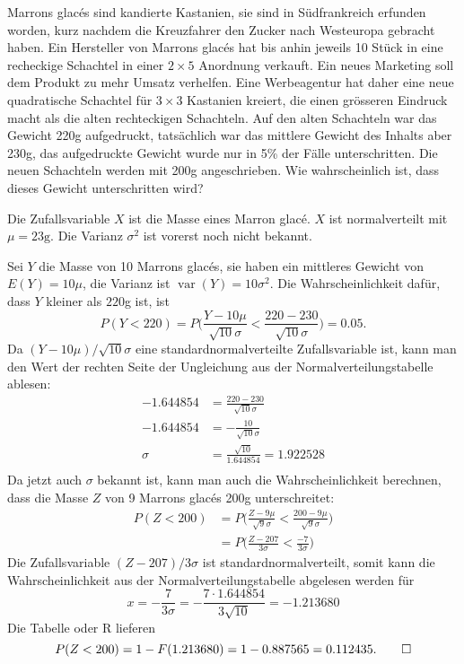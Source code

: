Marrons glac\'es sind kandierte Kastanien, sie sind in Südfrankreich
erfunden worden, kurz nachdem die Kreuzfahrer den Zucker nach Westeuropa
gebracht haben. Ein Hersteller von Marrons glac\'es hat bis anhin
jeweils 10 Stück in eine recheckige Schachtel in einer $2\times 5$
Anordnung verkauft. Ein neues Marketing soll dem Produkt zu mehr
Umsatz verhelfen. Eine Werbeagentur hat daher eine neue quadratische Schachtel 
für $3\times 3$ Kastanien kreiert, die einen grösseren Eindruck
macht als die alten rechteckigen Schachteln. Auf den alten Schachteln
war das Gewicht 220g aufgedruckt, tatsächlich war das mittlere
Gewicht des Inhalts aber 230g, das aufgedruckte Gewicht wurde
nur in 5\% der Fälle unterschritten. Die neuen Schachteln werden mit
200g angeschrieben. Wie wahrscheinlich ist, dass dieses Gewicht unterschritten
wird?


\begin{loesung}
Die Zufallsvariable $X$ ist die Masse eines Marron glac\'e. $X$ ist
normalverteilt mit $\mu = 23\text{g}$. Die Varianz $\sigma^2$ ist vorerst
noch nicht bekannt.

Sei $Y$ die Masse von 10 Marrons glac\'es, sie haben ein mittleres Gewicht von
$E(Y)=10\mu$, die Varianz ist $\operatorname{var}(Y)=10\sigma^2$.
Die Wahrscheinlichkeit dafür, dass $Y$ kleiner als $220$g ist, ist
\[
P(Y<220)=P\biggl(\frac{Y-10\mu}{\sqrt{10}\sigma}<\frac{220-230}{\sqrt{10}\sigma}\biggr)=0.05.
\]
Da $(Y-10\mu)/\sqrt{10}\sigma$ eine standardnormalverteilte Zufallsvariable
ist, kann man den Wert der rechten Seite der Ungleichung aus der
Normalverteilungstabelle ablesen:
\begin{align*}
-1.644854&= \frac{220-230}{\sqrt{10}\sigma}\\
-1.644854&= -\frac{10}{\sqrt{10}\sigma}\\
\sigma &= \frac{\sqrt{10}}{1.644854}=1.922528\\
\end{align*}
Da jetzt auch $\sigma$ bekannt ist, kann man auch die Wahrscheinlichkeit
berechnen, dass die Masse $Z$ von 9 Marrons glac\'es 200g unterschreitet:
\begin{align*}
P(Z<200)
&=
P\biggl(\frac{Z-9\mu}{\sqrt{9}\sigma}<\frac{200-9\mu}{\sqrt{9}\sigma} \biggr)
\\
&=
P\biggl(\frac{Z-207}{3\sigma}<\frac{-7}{3\sigma} \biggr)
\end{align*}
Die Zufallsvariable $(Z-207)/3\sigma$ ist standardnormalverteilt, somit
kann die Wahrscheinlichkeit aus der Normalverteilungstabelle abgelesen
werden für
\[
x=-\frac{7}{3\sigma}=-\frac{7\cdot1.644854}{3\sqrt{10}}=-1.213680
\]
Die Tabelle oder R lieferen
\[
P(Z<200)=1-F(1.213680)=1-0.887565=0.112435.
\qedhere
\]
\end{loesung}


